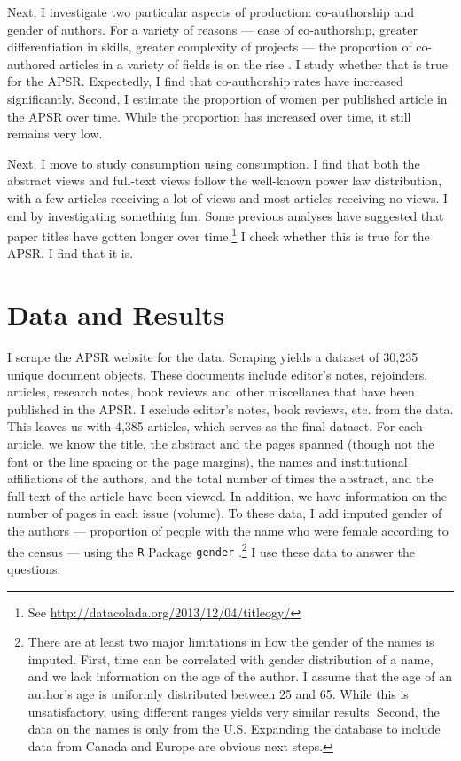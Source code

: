 \documentclass[12pt]{article}
\begin{document}
Next, I investigate two particular aspects of production: co-authorship and gender of authors. For a variety of reasons --- ease of co-authorship, greater differentiation in skills, greater complexity of projects --- the proportion of co-authored articles in a variety of fields is on the rise \citep{barnett1988rising, card2013nine, cunningham1997authorship}. I study whether that is true for the APSR. Expectedly, I find that co-authorship rates have increased significantly. Second, I estimate the proportion of women per published article in the APSR over time. While the proportion has increased over time, it still remains very low.  

Next, I move to study consumption using consumption. I find that both the abstract views and full-text views follow the well-known power law distribution, with a few articles receiving a lot of views and most articles receiving no views. I end by investigating something fun. Some previous analyses have suggested that paper titles have gotten longer over time.\footnote{See \href{http://datacolada.org/2013/12/04/titleogy/}{http://datacolada.org/2013/12/04/titleogy/}} I check whether this is true for the APSR. I find that it is.

\section*{Data and Results} 
I scrape the APSR website for the data. Scraping yields a dataset of 30,235 unique document objects. These documents include editor's notes, rejoinders, articles, research notes, book reviews and other miscellanea that have been published in the APSR. I exclude editor's notes, book reviews, etc. from the data. This leaves us with 4,385 articles, which serves as the final dataset. For each article, we know the title, the abstract and the pages spanned (though not the font or the line spacing or the page margins), the names and institutional affiliations of the authors, and the total number of times the abstract, and the full-text of the article have been viewed. In addition, we have information on the number of pages in each issue (volume). To these data, I add imputed gender of the authors --- proportion of people with the name who were female according to the census --- using the {\tt R} Package {\tt gender} \citep{lincoln2015}.\footnote{There are at least two major limitations in how the gender of the names is imputed. First, time can be correlated with gender distribution of a name, and we lack information on the age of the author. I assume that the age of an author's age is uniformly distributed between 25 and 65. While this is unsatisfactory, using different ranges yields very similar results. Second, the data on the names is only from the U.S. Expanding the database to include data from Canada and Europe are obvious next steps.} I use these data to answer the questions.
\end{document}
